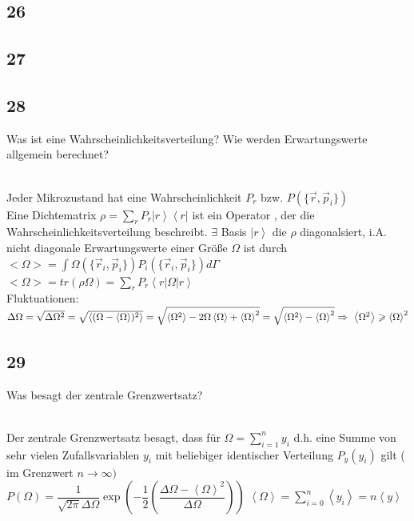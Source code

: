 \subsection{26}
\begin{myfrag}
\end{myfrag}
\subsection{27}
\begin{myfrag}

\end{myfrag}
\subsection{28}
\begin{myfrag}
Was ist eine Wahrscheinlichkeitsverteilung? Wie werden Erwartungswerte
allgemein berechnet?
\end{myfrag} \quad \\
Jeder Mikrozustand hat eine Wahrscheinlichkeit $P_r$ bzw. $P(\{ \vec{r},\vec{p} _i \} )$ \\ Eine Dichtematrix $\rho = \sum_r P_r \left|r\right\rangle \left\langle r \right| $ ist ein Operator , der die Wahrscheinlichkeitsverteilung beschreibt. $\exists$ Basis $\left| r \right\rangle$ die $\rho $ diagonalsiert, i.A. nicht diagonale Erwartungswerte einer Größe $\Omega $ ist durch \\[1ex]
$<\Omega > = \int \Omega ( \{ \vec{r} _i , \vec{p} _i \}) P_i(\{ \vec{r} _i , \vec{p} _i \} ) d\Gamma $\\[1ex]
$<\Omega> = tr(\rho \Omega )= \sum _ r P_r \left\langle r \right| \Omega \left| r \right\rangle $ \\
Fluktuationen: \\[1ex]
$\Delta \Omega = \sqrt{\Delta \Omega ^2} = \sqrt{\left\langle (\Omega - \left\langle \Omega \right\rangle ) ^2 \right\rangle} = \sqrt{\left\langle \Omega ^2 \right\rangle - 2 \Omega \left\langle \Omega \right\rangle  + \left\langle \Omega \right\rangle ^2} = \sqrt{\left\langle \Omega ^2 \right\rangle - \left\langle \Omega \right\rangle ^2} \\ \Rightarrow \ \left\langle \Omega ^2 \right\rangle \geqslant  \left\langle \Omega \right\rangle ^2 $
\subsection{29}
\begin{myfrag}
Was besagt der zentrale Grenzwertsatz?
\end{myfrag} \quad \\
Der zentrale Grenzwertsatz besagt, dass für $ \Omega = \sum \limits_{i=1}^n y_i $ d.h. eine Summe von sehr vielen Zufallsvariablen $y_i$ mit beliebiger identischer Verteilung $P_y(y_i)$ gilt ( im Grenzwert $ n \rightarrow \infty) $ \\[1ex]
$ P (\Omega ) = \dfrac{1}{\sqrt{2 \pi}\Delta \Omega } \exp\left(- \dfrac{1}{2} \left( \dfrac{\Delta \Omega - \left\langle \Omega \right\rangle ^2}{\Delta \Omega} \right) \right)$  \qquad $ \left\langle \Omega \right\rangle  = \sum \limits_{i=0}^n \left\langle y_i \right\rangle = n \left\langle y \right\rangle $